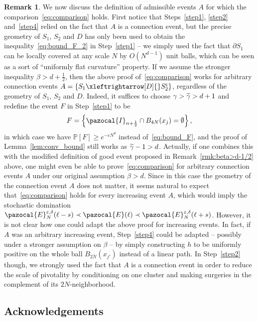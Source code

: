 \documentclass[10pt]{amsart}
\theoremstyle{definition}\newtheorem{defi}[theo]{Definition}\newtheorem{rema}[theo]{Remark}\newtheorem{exam}[theo]{Example}\newtheorem{exem}[theo]{Example}\newtheorem{nota}[theo]{Notation}
\renewcommand{\P}{\mathbb{P}}
\newcommand{\sfc}{\mathsf{c}}
\newcommand{\lr}[4]{#3\xleftrightarrow[#1]{#2} #4}
\let\oldtilde\tilde
\renewcommand*{\tilde}[1]{\mathchoice{\widetilde{#1}}{\widetilde{#1}}{\oldtilde{#1}}{\oldtilde{#1}}}
\begin{document}
\begin{rema}\label{rmk:beta>d}
We now discuss the definition of admissible events $A$ for which the comparison~\eqref{eq:comparison} holds. First notice that Steps~\ref{step1}, \ref{step2} and~\ref{step4} relied on the fact that $A$ is a connection event, but the precise geometry of $S_1$, $S_2$ and $D$ has only been used to obtain the inequality~\eqref{eq:bound_F_2} in Step~\ref{step1} -- we simply used the fact that $\partial S_1$ can be locally covered at any scale $N$ by $O(N^{d-1})$ unit balls, which can be seen as a sort of ``uniformly flat curvature'' property. If we assume the stronger inequality $\beta>d+\tfrac12$, then the above proof of~\eqref{eq:comparison} works for arbitrary connection events $A=\{\lr{D}{}{S_1}{S_2^{\sfc}}\}$,
regardless of the geometry of $S_1$, $S_2$ and $D$. Indeed, it suffices to choose $\gamma>\tilde{\gamma}>d+1$ and redefine the event $F$ in Step~\ref{step1} to be 
\[
F=\left\{\pazocal{I}_{n+\frac12}\cap B_{4N}(x_j)=\emptyset\right\},
\]
in which case we have $\P[F]\geq e^{-cN^d}$ instead of~\eqref{eq:bound_F}, and the proof of Lemma~\ref{lem:conv_bound} still works as $\tilde{\gamma}-1>d$. Actually, if one combines this with the modified definition of good event proposed in Remark~\ref{rmk:beta>d-1/2} above, one might even be able to prove~\eqref{eq:comparison} for arbitrary connection events $A$ under our original assumption $\beta>d$. Since in this case the geometry of the connection event $A$ does not matter, it seems natural to expect that~\eqref{eq:comparison} holds for every increasing event $A$, which would imply the stochastic domination $\pazocal{E}^{\varepsilon,\delta}_{N}(\ell-s)\prec\pazocal{E}(\ell)\prec\pazocal{E}^{\varepsilon,\delta}_{N}(\ell+s)$. However, it is not clear how one could adapt the above proof for increasing events. In fact, if $A$ was an arbitrary increasing event, Step~\ref{step4} could be adapted -- possibly under a stronger assumption on $\beta$ -- by simply constructing $h$ to be uniformly positive on the whole ball $B_{2N}(x_{j'})$ instead of a linear path. In Step~\ref{step2} though, we strongly used the fact that $A$ is a connection event in order to reduce the scale of pivotality by conditioning on one cluster and making surgeries in the complement of its $2N$-neighborhood.
\end{rema}


\subsection*{Acknowledgements}
\end{document}
